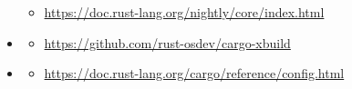 \documentclass{article}
\begin{document}
\begin{itemize}
    \begin{itemize}
        \item \url{https://doc.rust-lang.org/nightly/core/index.html}
    \end{itemize}
    \item \hypertarget{ref:cargo-xbuild}{\textbf{\color{medium}{Cargo XBuild}}}
    \begin{itemize}
        \item \url{https://github.com/rust-osdev/cargo-xbuild}
    \end{itemize}
    \item \hypertarget{ref:cargo-config}{\textbf{\color{medium}{Cargo Config}}}
    \begin{itemize}
        \item \url{https://doc.rust-lang.org/cargo/reference/config.html}
    \end{itemize}
 \end{itemize}
\end{document}
